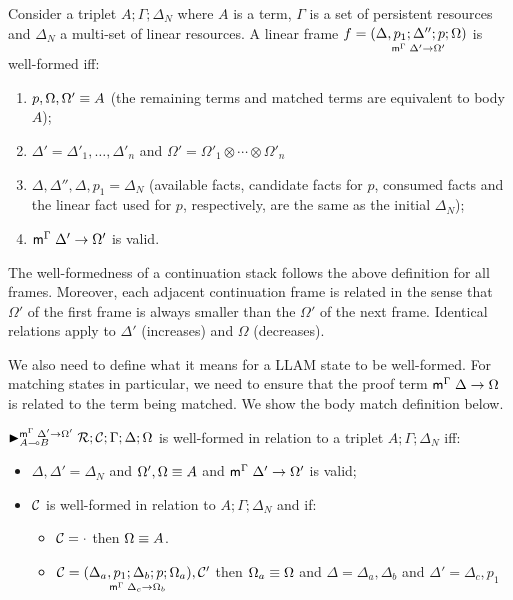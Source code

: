 \begin{definition}
  Consider a triplet $A; \Gamma; \Delta_{N}$ where $A$ is a term, $\Gamma$ is a
  set of persistent resources and $\Delta_{N}$ a multi-set of linear
  resources. A linear frame $f = \lframe{\Delta,
        p_1}{\Delta''}{p}{\Omega}{\Delta'}{\Omega'}$ is well-formed iff:

\begin{enumerate}
  \item $\feq{p, \Omega, \Omega'}{A}$ (the remaining terms and 
           matched terms are equivalent to body $A$);
  \item $\Delta' = \Delta'_1, \dotsc, \Delta'_n$ and $\Omega' =
  \Omega'_1 \otimes \dotsb \otimes \Omega'_n$
  \item $\Delta, \Delta'', \Delta, p_1 = \Delta_{N}$ (available facts, candidate
        facts for $p$, consumed facts and the linear fact used for $p$,
        respectively, are the same as the initial $\Delta_{N}$);
  \item $\mz{\Gamma}{\Delta'}{\Omega'}$ is valid.
\end{enumerate}
\end{definition}

The well-formedness of a continuation stack follows the above definition for all
frames. Moreover, each adjacent continuation frame is related in the sense that
$\Omega'$ of the first frame is always smaller than the $\Omega'$ of the next frame.
Identical relations apply to $\Delta'$ (increases) and $\Omega$ (decreases).

We also need to define what it means for a LLAM state to be well-formed. For
matching states in particular, we need to ensure that the proof term
$\mz{\Gamma}{\Delta}{\Omega}$ is related to the term being matched. We show
the body match definition below.

\begin{definition}
  $\matstate{A \lolli B}{\rulestk}{\lstack{C}}{\Gamma}{\Delta}{\Omega}{\Delta'
  \rightarrow \Omega'}$ is well-formed in relation to a triplet $A; \Gamma;
  \Delta_{N}$ iff:

  \begin{itemize}
     \item $\Delta, \Delta' = \Delta_{N}$ and $\feq{\Omega', \Omega}{A}$ and
        $\mz{\Gamma}{\Delta'}{\Omega'}$ is valid;
     \item $\lstack{C}$ is well-formed in relation to $A; \Gamma; \Delta_{N}$
        and if:
     \begin{itemize}
        \item $\lstack{C} = \cdot$ then $\feq{\Omega}{A}$.

        \item $\lstack{C} = \lframe{\Delta_a,
           p_1}{\Delta_b}{p}{\Omega_a}{\Delta_c}{\Omega_b}, \lstack{C'}$ then
           $\feq{\Omega_a}{\Omega}$ and $\Delta = \Delta_a, \Delta_b$ and
           $\Delta' = \Delta_c, p_1$

      \end{itemize}
   \end{itemize}
\end{definition}

